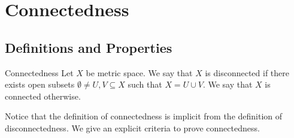 \documentclass[a4paper]{article}
\begin{document}
\pagebreak
\section{Connectedness}
\subsection{Definitions and Properties}
\begin{defn}{Connectedness}{} Let $X$ be metric space. We say that $X$ is disconnected if there exists open subsets $\emptyset\neq U,V\subseteq X$ such that $X=U\cup V$. We say that $X$ is connected otherwise. 
\end{defn}

Notice that the definition of connectedness is implicit from the definition of disconnectedness. We give an explicit criteria to prove connectedness. 
\end{document}
